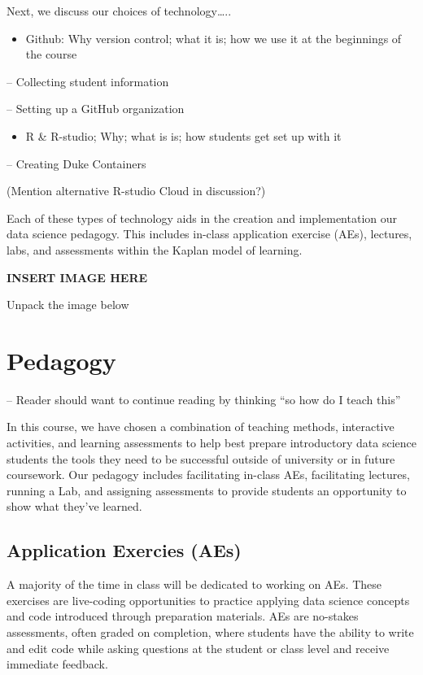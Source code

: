 \documentclass[
  12pt]{article}
\providecommand{\tightlist}{%
  \setlength{\itemsep}{0pt}\setlength{\parskip}{0pt}}\usepackage{longtable,booktabs,array}
\begin{document}
Next, we discuss our choices of technology\ldots..

\begin{itemize}
\tightlist
\item
  Github: Why version control; what it is; how we use it at the
  beginnings of the course
\end{itemize}

-- Collecting student information

-- Setting up a GitHub organization

\begin{itemize}
\tightlist
\item
  R \& R-studio; Why; what is is; how students get set up with it
\end{itemize}

-- Creating Duke Containers

(Mention alternative R-studio Cloud in discussion?)

Each of these types of technology aids in the creation and
implementation our data science pedagogy. This includes in-class
application exercise (AEs), lectures, labs, and assessments within the
Kaplan model of learning.

\textbf{INSERT IMAGE HERE}

Unpack the image below

\hypertarget{sec-ped}{%
\section{Pedagogy}\label{sec-ped}}

-- Reader should want to continue reading by thinking ``so how do I
teach this''

In this course, we have chosen a combination of teaching methods,
interactive activities, and learning assessments to help best prepare
introductory data science students the tools they need to be successful
outside of university or in future coursework. Our pedagogy includes
facilitating in-class AEs, facilitating lectures, running a Lab, and
assigning assessments to provide students an opportunity to show what
they've learned.

\hypertarget{application-exercies-aes}{%
\subsection{Application Exercies (AEs)}\label{application-exercies-aes}}

A majority of the time in class will be dedicated to working on AEs.
These exercises are live-coding opportunities to practice applying data
science concepts and code introduced through preparation materials. AEs
are no-stakes assessments, often graded on completion, where students
have the ability to write and edit code while asking questions at the
student or class level and receive immediate feedback.
\end{document}
